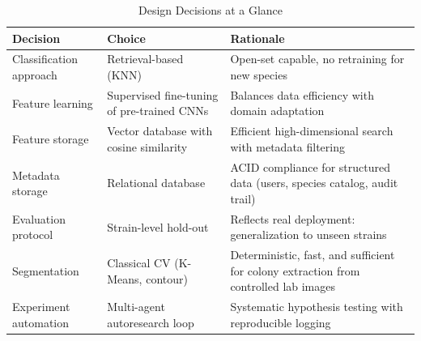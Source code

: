 \begin{table}[H]
\centering
\caption{Design Decisions at a Glance}
\label{tab:design-decisions}
\begin{tabular}{@{}p{3.5cm} p{4.5cm} p{6cm}@{}}
\toprule
\textbf{Decision} & \textbf{Choice} & \textbf{Rationale} \\
\midrule
Classification approach & Retrieval-based (KNN) & Open-set capable, no retraining for new species \\
Feature learning & Supervised fine-tuning of pre-trained CNNs & Balances data efficiency with domain adaptation \\
Feature storage & Vector database with cosine similarity & Efficient high-dimensional search with metadata filtering \\
Metadata storage & Relational database & ACID compliance for structured data (users, species catalog, audit trail) \\
Evaluation protocol & Strain-level hold-out & Reflects real deployment: generalization to unseen strains \\
Segmentation & Classical CV (K-Means, contour) & Deterministic, fast, and sufficient for colony extraction from controlled lab images \\
Experiment automation & Multi-agent autoresearch loop & Systematic hypothesis testing with reproducible logging \\
\bottomrule
\end{tabular}
\end{table}
